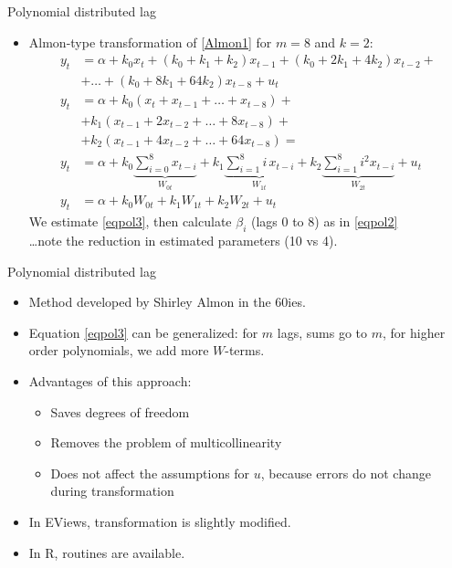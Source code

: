 \documentclass{beamer}
\begin{document}

\begin{frame}{Polynomial distributed lag}
\begin{itemize}
\item Almon-type transformation of \eqref{Almon1} for $m=8$ and $k=2$:
\begin{align} \nonumber
y_t & =  \alpha + k_0 x_t + (k_0 + k_1 + k_2)x_{t-1} + (k_0 + 2k_1 + 4k_2)x_{t-2} + \\ & + \dots + (k_0 + 8k_1 + 64k_2)x_{t-8}+u_t 
\\ \nonumber
y_t & = \alpha + k_0 (x_t + x_{t-1} + \dots + x_{t-8}) + \\ \nonumber & +  k_1(x_{t-1} + 2 x_{t-2} + \dots + 8 x_{t-8}) + \\ \nonumber & + k_2(x_{t-1} + 4x_{t-2} + \dots + 64x_{t-8}) = \\ 
y_t & = \alpha + k_0 \underbrace{\sum_{i=0}^8 x_{t-i}}_{W_{0t}} + k_1 \underbrace{\sum_{i=1}^8 i\, x_{t-i}}_{W_{1t}}  + k_2 \underbrace{\sum_{i=1}^8 i^2 x_{t-i}}_{W_{2t}}  + u_t\\
y_t & = \alpha + k_0 W_{0t} + k_1 W_{1t} + k_2 W_{2t} + u_t \label{eqpol3}
\end{align}
We estimate \eqref{eqpol3}, then calculate $\beta_i$ (lags 0 to 8) as in \eqref{eqpol2}\\
\dots note the reduction in estimated parameters (10 vs 4).
\end{itemize}
\end{frame}


\begin{frame}{Polynomial distributed lag}

\begin{itemize}
\item Method developed by Shirley Almon in the 60ies.
\item Equation \eqref{eqpol3} can be generalized: for $m$ lags, sums go to $m$, for higher order polynomials, we add more $W$-terms.
\vspace{0.3cm}
\item Advantages of this approach:
\begin{itemize}
\item Saves degrees of freedom
 \item Removes the problem of multicollinearity
 \item Does not affect the assumptions for $u$, because errors do not change during transformation
\end{itemize}
\vspace{0.3cm}
\item In EViews, transformation is slightly modified.
\item In R, routines are available.

\end{itemize}
\end{frame}
\end{document}
